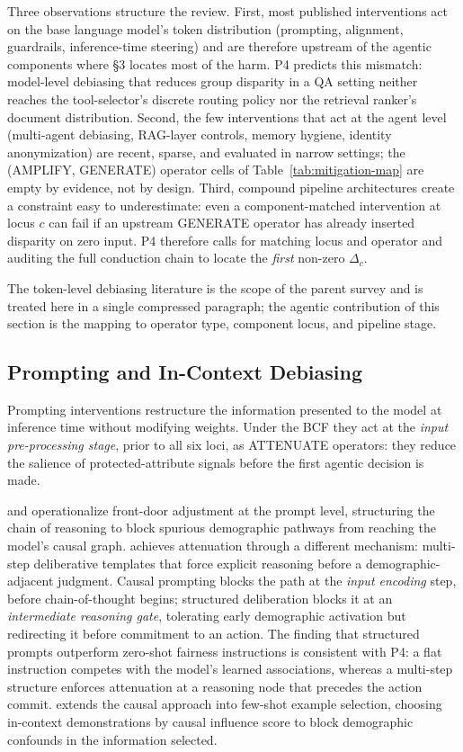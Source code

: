 \documentclass[acmsmall,nonacm]{acmart}
\begin{document}
Three observations structure the review. First, most published interventions act on the base language model's token distribution (prompting, alignment, guardrails, inference-time steering) and are therefore upstream of the agentic components where \S{}3 locates most of the harm. P4 predicts this mismatch: model-level debiasing that reduces group disparity in a QA setting neither reaches the tool-selector's discrete routing policy nor the retrieval ranker's document distribution. Second, the few interventions that act at the agent level (multi-agent debiasing, RAG-layer controls, memory hygiene, identity anonymization) are recent, sparse, and evaluated in narrow settings; the (AMPLIFY, GENERATE) operator cells of Table~\ref{tab:mitigation-map} are empty by evidence, not by design. Third, compound pipeline architectures create a constraint easy to underestimate: even a component-matched intervention at locus $c$ can fail if an upstream GENERATE operator has already inserted disparity on zero input. P4 therefore calls for matching locus and operator and auditing the full conduction chain to locate the \emph{first} non-zero $\Delta_c$.

The token-level debiasing literature is the scope of the parent survey \cite{chu2024fairness} and is treated here in a single compressed paragraph; the agentic contribution of this section is the mapping to operator type, component locus, and pipeline stage.

\subsection{Prompting and In-Context Debiasing}

Prompting interventions restructure the information presented to the model at inference time without modifying weights. Under the BCF they act at the \emph{input pre-processing stage}, prior to all six loci, as ATTENUATE operators: they reduce the salience of protected-attribute signals before the first agentic decision is made.

\cite{li2024prompting} and \cite{zhang2024causal} operationalize front-door adjustment at the prompt level, structuring the chain of reasoning to block spurious demographic pathways from reaching the model's causal graph. \cite{furniturewala2024thinking} achieves attenuation through a different mechanism: multi-step deliberative templates that force explicit reasoning before a demographic-adjacent judgment. Causal prompting blocks the path at the \emph{input encoding} step, before chain-of-thought begins; structured deliberation blocks it at an \emph{intermediate reasoning gate}, tolerating early demographic activation but redirecting it before commitment to an action. The finding that structured prompts outperform zero-shot fairness instructions is consistent with P4: a flat instruction competes with the model's learned associations, whereas a multi-step structure enforces attenuation at a reasoning node that precedes the action commit. \cite{du2024causal} extends the causal approach into few-shot example selection, choosing in-context demonstrations by causal influence score to block demographic confounds in the information selected.
\end{document}
